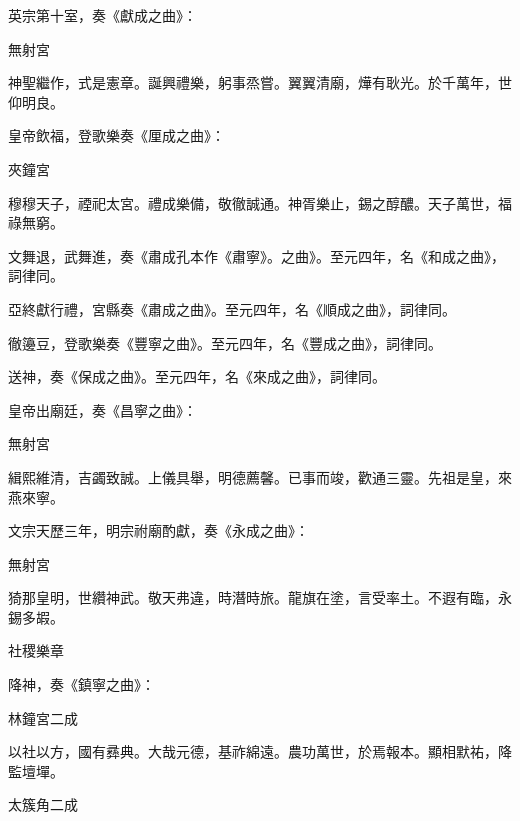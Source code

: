 \begin{pinyinscope}
 英宗第十室，奏《獻成之曲》：



 無射宮



 神聖繼作，式是憲章。誕興禮樂，躬事烝嘗。翼翼清廟，燁有耿光。於千萬年，世仰明良。



 皇帝飲福，登歌樂奏《厘成之曲》：



 夾鐘宮



 穆穆天子，禋祀太宮。禮成樂備，敬徹誠通。神胥樂止，錫之醇醲。天子萬世，福祿無窮。



 文舞退，武舞進，奏《肅成孔本作《肅寧》。之曲》。至元四年，名《和成之曲》，詞律同。



 亞終獻行禮，宮縣奏《肅成之曲》。至元四年，名《順成之曲》，詞律同。



 徹籩豆，登歌樂奏《豐寧之曲》。至元四年，名《豐成之曲》，詞律同。



 送神，奏《保成之曲》。至元四年，名《來成之曲》，詞律同。



 皇帝出廟廷，奏《昌寧之曲》：



 無射宮



 緝熙維清，吉蠲致誠。上儀具舉，明德薦馨。已事而竣，歡通三靈。先祖是皇，來燕來寧。



 文宗天歷三年，明宗祔廟酌獻，奏《永成之曲》：



 無射宮



 猗那皇明，世纘神武。敬天弗違，時潛時旅。龍旗在塗，言受率土。不遐有臨，永錫多嘏。



 社稷樂章



 降神，奏《鎮寧之曲》：



 林鐘宮二成



 以社以方，國有彞典。大哉元德，基祚綿遠。農功萬世，於焉報本。顯相默祐，降監壇墠。



 太簇角二成




\end{pinyinscope}

